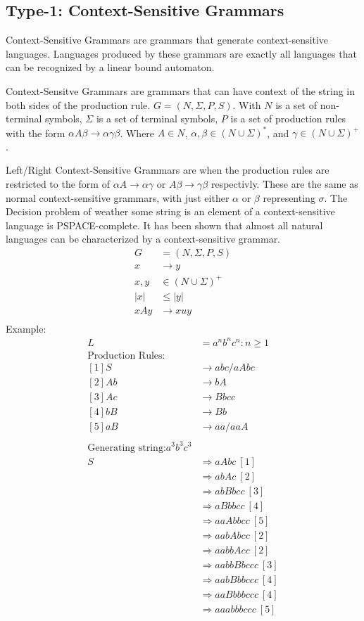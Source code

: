 \documentclass[12pt]{article}
\begin{document}
\subsection{Type-1: Context-Sensitive Grammars}
\par
Context-Sensitive Grammars are grammars that generate context-sensitive languages. Languages produced by these grammars are exactly all languages that can be recognized by a linear bound automaton.
\par
Context-Sensitve Grammars are grammars that can have context of the string in both sides of the production rule. $G = (N, \Sigma, P, S)$. With $N$ is a set of non-terminal symbols, $\Sigma$ is a set of terminal symbols, $P$ is a set of production rules with the form $\alpha A \beta \rightarrow \alpha \gamma \beta$. Where $A\in N$, $\alpha,\beta \in (N\cup \Sigma)^{*}$, and $\gamma \in (N\cup \Sigma)^{+}$.
\par
Left/Right Context-Sensitive Grammars are when the production rules are restricted to the form of $\alpha A \rightarrow \alpha \gamma$ or $A \beta \rightarrow \gamma \beta$ respectivly. These are the same as normal context-sensitive grammars, with just either $\alpha$ or $\beta$ representing $\sigma$. The Decision problem of weather some string is an element of a context-sensitive language is PSPACE-complete. It has been shown that almost all natural languages can be characterized by a context-sensitive grammar.
\begin{align*}
  G&=(N, \Sigma, P, S)\\
  x&\rightarrow y\\
  x,y&\in(N\cup\Sigma)^{+}\\
  |x| &\leq |y|\\
  xAy &\rightarrow xuy\\
\end{align*}
Example:
\begin{align*}
  L &= {a^nb^nc^n: n \geq 1}\\
  \text{Production Rules:}&\\
  [1]S &\rightarrow abc/aAbc\\
  [2]Ab &\rightarrow bA\\
  [3]Ac &\rightarrow Bbcc\\
  [4]bB &\rightarrow Bb\\
  [5]aB &\rightarrow aa/aaA\\\\
  \text{Generating string:} a^3b^3c^3\\
  S &\Rightarrow aAbc\ [1]\\
  &\Rightarrow abAc\ [2]\\
  &\Rightarrow abBbcc\ [3]\\
  &\Rightarrow aBbbcc\ [4]\\
  &\Rightarrow aaAbbcc\ [5]\\
  &\Rightarrow aabAbcc\ [2]\\
  &\Rightarrow aabbAcc\ [2]\\
  &\Rightarrow aabbBbccc\ [3]\\
  &\Rightarrow aabBbbccc\ [4]\\
  &\Rightarrow aaBbbbccc\ [4]\\
  &\Rightarrow aaabbbccc\ [5]\\
\end{align*}
\newpage
\printbibliography
\end{document}
